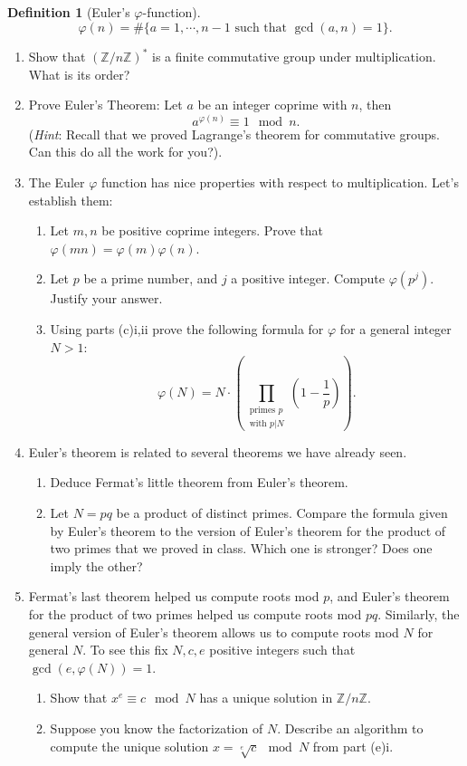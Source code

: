 \documentclass[11pt]{article}
\newtheorem{definition}{Definition}
\newcommand{\bZ}{\mathbb{Z}}
\begin{document}
\begin{enumerate}
{\begin{definition}[Euler's $\varphi$-function]
    \[\varphi(n) = \#\{a = 1,\cdots,n-1\text{ such that }\gcd(a,n) = 1\}.\]
  \end{definition}
  \begin{enumerate}
    \item{
    Show that $(\bZ/n\bZ)^*$ is a finite commutative group under multiplication.  What is its order?
    }
    \item{
    Prove Euler's Theorem: Let $a$ be an integer coprime with $n$, then
    \[a^{\varphi(n)}\equiv1\mod n.\]
    (\textit{Hint}: Recall that we proved Lagrange's theorem for commutative groups.  Can this do all the work for you?).
    }
    \item{The Euler $\varphi$ function has nice properties with respect to multiplication.  Let's establish them:
    \begin{enumerate}
      \item{
      Let $m,n$ be positive coprime integers.  Prove that $\varphi(mn)=\varphi(m)\varphi(n)$.
      }
      \item{
      Let $p$ be a prime number, and $j$ a positive integer.  Compute $\varphi(p^j)$.  Justify your answer.
      }
      \item{
      Using parts (c)i,ii prove the following formula for $\varphi$ for a general integer $N>1$:
      \[\varphi(N) = N\cdot\left(\prod_{\substack{\text{primes }p\\ \text{with }p|N}}\left(1-\frac{1}{p}\right)\right).\]
      }
    \end{enumerate}
    }
    \item{
    Euler's theorem is related to several theorems we have already seen.
    \begin{enumerate}
      \item{
      Deduce Fermat's little theorem from Euler's theorem.
      }
      \item{
      Let $N=pq$ be a product of distinct primes.  Compare the formula given by Euler's theorem to the version of Euler's theorem for the product of two primes that we proved in class.  Which one is stronger?  Does one imply the other?
      }
    \end{enumerate}
    }
    \item{
    Fermat's last theorem helped us compute roots mod $p$, and Euler's theorem for the product of two primes helped us compute roots mod $pq$.  Similarly, the general version of Euler's theorem allows us to compute roots mod $N$ for general $N$.  To see this fix $N,c,e$ positive integers such that $\gcd(e,\varphi(N)) = 1$.
    \begin{enumerate}
      \item{
      Show that $x^e\equiv c\mod N$ has a unique solution in $\bZ/n\bZ$.
      }
      \item{
      Suppose you know the factorization of $N$.  Describe an algorithm to compute the unique solution $x = \sqrt[e]{c}\mod N$ from part (e)i.
      }
    \end{enumerate}
    }
  \end{enumerate}
  }
\end{enumerate}
\end{document}
